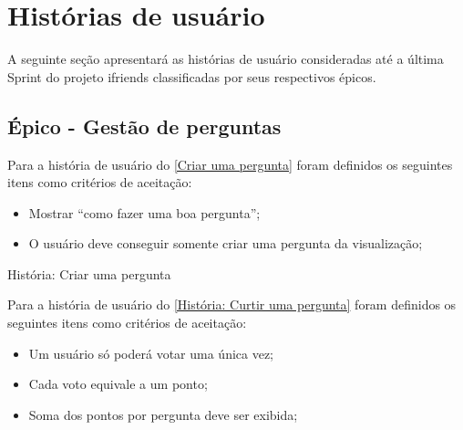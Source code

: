 \chapter{Histórias de usuário}
\label{historias de usuario}
A seguinte seção apresentará as histórias de usuário consideradas até a última \gls{Sprint} do projeto \gls{ifriends} classificadas por seus respectivos épicos.

\section{Épico - Gestão de perguntas}
\label{gestão_perguntas}
Para a história de usuário do \autoref{Criar uma pergunta} foram definidos os seguintes itens como critérios de aceitação:

\begin{itemize}
\item Mostrar ``como fazer uma boa pergunta'';
\item O usuário deve conseguir somente criar uma pergunta da visualização;
\end{itemize}

\def\arraystretch{2}
\begin{quadro}[htb]
\centering
\ABNTEXfontereduzida
\caption[História: Criar uma pergunta]{História: Criar uma pergunta}
\label{Criar uma pergunta}
\end{quadro}
\FloatBarrier 

Para a história de usuário do \autoref{História: Curtir uma pergunta}  foram definidos os seguintes itens como critérios de aceitação:

\begin{itemize}
\item Um usuário só poderá votar uma única vez;
\item Cada voto equivale a um ponto;
\item Soma dos pontos por pergunta deve ser exibida;
\end{itemize}

